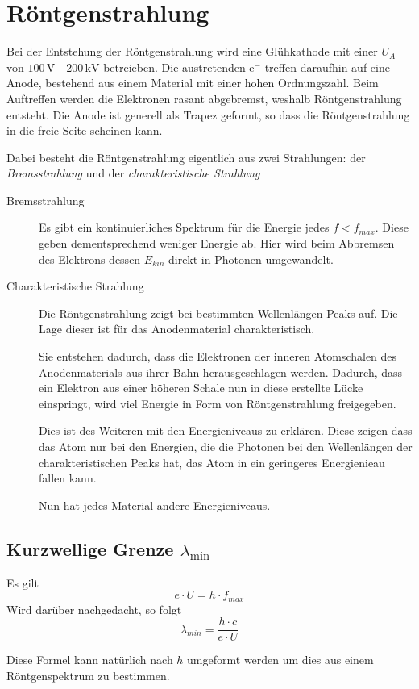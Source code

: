 \documentclass{article}
\begin{document}
\section{Röntgenstrahlung}
Bei der Entstehung der Röntgenstrahlung wird eine Glühkathode mit einer $U_A$ von $100\, \text{V}$ - $200\, \text{kV}$ betreieben. Die austretenden e$^-$ treffen daraufhin auf eine Anode, bestehend aus einem Material mit einer hohen Ordnungszahl. Beim Auftreffen werden die Elektronen rasant abgebremst, weshalb Röntgenstrahlung entsteht. Die Anode ist generell als Trapez geformt, so dass die Röntgenstrahlung in die freie Seite scheinen kann.
 
Dabei besteht die Röntgenstrahlung eigentlich aus zwei Strahlungen: der \emph{Bremsstrahlung} und der \emph{charakteristische Strahlung}
\begin{description} 
 \item[Bremsstrahlung] Es gibt ein kontinuierliches Spektrum für die Energie jedes $f < f_{max}$. Diese geben dementsprechend weniger Energie ab. Hier wird beim Abbremsen des Elektrons dessen $E_{kin}$ direkt in Photonen umgewandelt.
 \item[Charakteristische Strahlung] Die Röntgenstrahlung zeigt bei bestimmten Wellenlängen Peaks auf. Die Lage dieser ist für das Anodenmaterial charakteristisch.
 
Sie entstehen dadurch, dass die Elektronen der inneren Atomschalen des Anodenmaterials aus ihrer Bahn herausgeschlagen werden. Dadurch, dass ein Elektron aus einer höheren Schale nun in diese erstellte Lücke einspringt, wird viel Energie in Form von Röntgenstrahlung freigegeben.
 
Dies ist des Weiteren mit den \hyperref[Energieniveaus]{Energieniveaus} zu erklären. Diese zeigen dass das Atom nur bei den Energien, die die Photonen bei den Wellenlängen der charakteristischen Peaks hat, das Atom in ein geringeres Energienieau fallen kann.
 
Nun hat jedes Material andere Energieniveaus. 
\end{description} 
 
\subsection{Kurzwellige Grenze $\lambda_{\text{min}}$} 
Es gilt 
\[
 e \cdot U = h \cdot f_{max} 
\]
Wird darüber nachgedacht, so folgt
\[
 \lambda_{min} = \frac{h \cdot c}{e \cdot U} 
\]
 
Diese Formel kann natürlich nach $h$ umgeformt werden um dies aus einem Röntgenspektrum zu bestimmen. 
 
\end{document}

